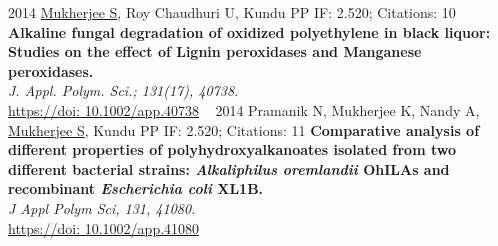 \documentclass[]{friggeri-cv}
\begin{document}
\begin{entrylist}
	{2014}
	{\underline{Mukherjee S}, Roy Chaudhuri U, Kundu PP}
	{IF: 2.520; Citations: 10}
	{\textbf{Alkaline fungal degradation of oxidized polyethylene in black liquor: Studies on the effect of Lignin peroxidases and Manganese peroxidases.}\\
	\emph{J. Appl. Polym. Sci.; 131(17), 40738.}\\ \href{https://doi.org/10.1002/app.40738}{https://doi: 10.1002/app.40738}}
~
\entry
	{2014}
	{Pramanik N, Mukherjee K, Nandy A, \underline{Mukherjee S}, Kundu PP}
	{IF: 2.520; Citations: 11}
	{\textbf{Comparative analysis of different properties of polyhydroxyalkanoates isolated from two different bacterial strains: \textit{Alkaliphilus oremlandii} OhILAs and recombinant \textit{Escherichia coli} XL1B.}\\
	\emph{J Appl Polym Sci, 131, 41080.}\\
	 \href{https://onlinelibrary.wiley.com/doi/epdf/10.1002/app.41080}{https://doi: 10.1002/app.41080\\}}
\end{entrylist}
\end{document}
